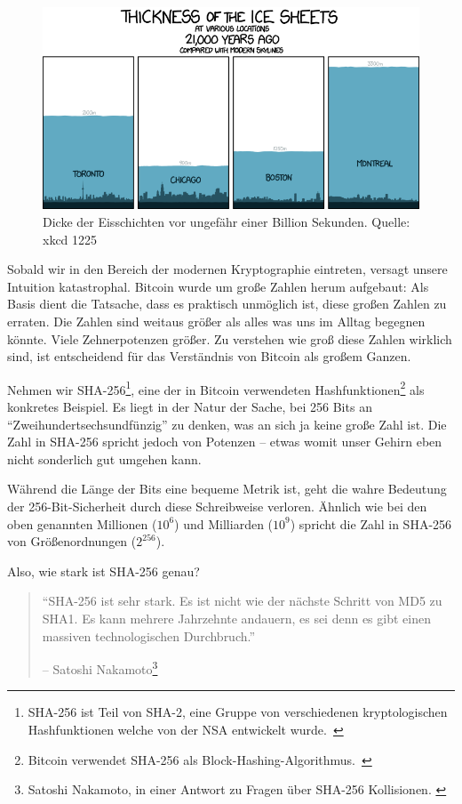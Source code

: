 \begin{figure}
  \includegraphics[width=\textwidth]{assets/images/xkcd-1225.png}
  \caption{Dicke der Eisschichten vor ungefähr einer Billion Sekunden. Quelle: xkcd 1225}
  \label{fig:xkcd-1225}
\end{figure}

Sobald wir in den Bereich der modernen Kryptographie eintreten, versagt unsere
Intuition katastrophal. Bitcoin wurde um große Zahlen herum aufgebaut: Als Basis dient
die Tatsache, dass es praktisch unmöglich ist, diese großen Zahlen zu erraten. Die Zahlen sind
weitaus größer als alles was uns im Alltag begegnen könnte. Viele Zehnerpotenzen
größer. Zu verstehen wie groß diese Zahlen wirklich sind, ist entscheidend für
das Verständnis von Bitcoin als großem Ganzen.

Nehmen wir SHA-256\footnote{SHA-256 ist Teil von SHA-2, eine Gruppe von
verschiedenen kryptologischen Hashfunktionen welche von der NSA entwickelt
wurde.~\cite{wiki:sha2}}, eine der in Bitcoin verwendeten
Hashfunktionen\footnote{Bitcoin verwendet SHA-256 als
Block-Hashing-Algorithmus.~\cite{btcwiki:block-hashing}} als konkretes Beispiel.
Es liegt in der Natur der Sache, bei 256 Bits an
\enquote{Zweihundertsechsundfünzig} zu denken, was an sich ja keine große Zahl
ist. Die Zahl in SHA-256 spricht jedoch von Potenzen -- etwas womit unser Gehirn
eben nicht sonderlich gut umgehen kann.

Während die Länge der Bits eine bequeme Metrik ist, geht die wahre Bedeutung der
256-Bit-Sicherheit durch diese Schreibweise verloren. Ähnlich wie bei den oben
genannten Millionen ($10^6$) und Milliarden ($10^9$) spricht die Zahl in SHA-256
von Größenordnungen ($2^{256}$).

Also, wie stark ist SHA-256 genau?

\begin{quotation}\begin{samepage}
\enquote{SHA-256 ist sehr stark. Es ist nicht wie der nächste Schritt von MD5 zu
SHA1. Es kann mehrere Jahrzehnte andauern, es sei denn es gibt einen massiven
technologischen Durchbruch.}
\begin{flushright} -- Satoshi Nakamoto\footnote{Satoshi Nakamoto, in einer
Antwort zu Fragen über SHA-256 Kollisionen. \cite{satoshi-sha256}}
\end{flushright}\end{samepage}\end{quotation}

